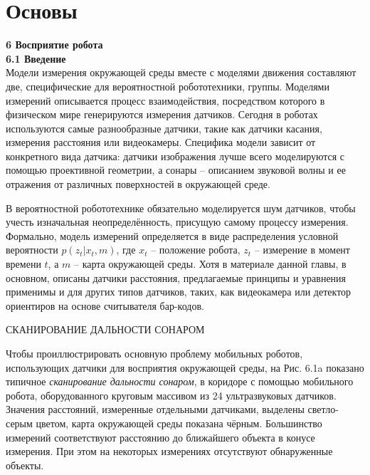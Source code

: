 \documentclass[10pt,a4paper]{article}
\begin{document}
\part{Основы}


\textbf{6 Восприятие робота}\\

\textbf{6.1 Введение}\\

Модели измерения окружающей среды вместе с моделями движения составляют две, специфические для вероятностной робототехники, группы. Моделями измерений описывается процесс взаимодействия, посредством которого в физическом мире генерируются измерения датчиков. Сегодня в роботах используются самые разнообразные датчики, такие как датчики касания, измерения расстояния или видеокамеры. Специфика модели зависит от конкретного вида датчика: датчики изображения лучше всего моделируются с помощью проективной геометрии, а сонары – описанием звуковой волны и ее отражения от различных поверхностей в окружающей среде. 

В вероятностной робототехнике  обязательно моделируется шум датчиков, чтобы учесть изначальная неопределённость, присущую самому процессу измерения. Формально, модель измерений определяется в виде распределения условной вероятности $p(z_t | x_t, m)$, где $x_t$ – положение робота, $z_t$ – измерение в момент времени $t$, а $m$ – карта окружающей среды. Хотя в материале данной главы, в основном, описаны датчики расстояния, предлагаемые принципы и уравнения применимы и для других типов датчиков, таких, как видеокамера или детектор ориентиров на основе считывателя бар-кодов. 

СКАНИРОВАНИЕ ДАЛЬНОСТИ СОНАРОМ

Чтобы проиллюстрировать основную проблему мобильных роботов, использующих датчики для восприятия окружающей среды, на Рис. 6.1a показано типичное \textit{сканирование дальности сонаром}, в коридоре с помощью мобильного робота, оборудованного круговым массивом из 24 ультразвуковых датчиков. Значения расстояний, измеренные отдельными датчиками, выделены светло-серым цветом, карта окружающей среды показана чёрным. 
Большинство измерений соответствуют расстоянию до ближайшего объекта в конусе измерения. При этом на некоторых измерениях  отсутствуют обнаруженные объекты. 
\end{document}
